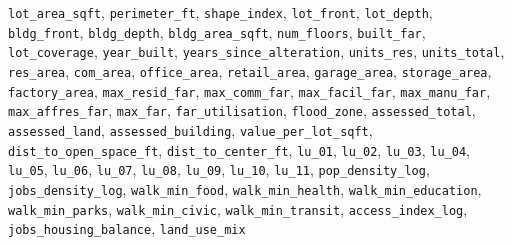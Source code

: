 \texttt{lot\_area\_sqft}, \allowbreak \texttt{perimeter\_ft}, \allowbreak \texttt{shape\_index}, \allowbreak \texttt{lot\_front}, \allowbreak \texttt{lot\_depth}, \allowbreak \texttt{bldg\_front}, \allowbreak \texttt{bldg\_depth}, \allowbreak \texttt{bldg\_area\_sqft}, \allowbreak \texttt{num\_floors}, \allowbreak \texttt{built\_far}, \allowbreak \texttt{lot\_coverage}, \allowbreak \texttt{year\_built}, \allowbreak \texttt{years\_since\_alteration}, \allowbreak \texttt{units\_res}, \allowbreak \texttt{units\_total}, \allowbreak \texttt{res\_area}, \allowbreak \texttt{com\_area}, \allowbreak \texttt{office\_area}, \allowbreak \texttt{retail\_area}, \allowbreak \texttt{garage\_area}, \allowbreak \texttt{storage\_area}, \allowbreak \texttt{factory\_area}, \allowbreak \texttt{max\_resid\_far}, \allowbreak \texttt{max\_comm\_far}, \allowbreak \texttt{max\_facil\_far}, \allowbreak \texttt{max\_manu\_far}, \allowbreak \texttt{max\_affres\_far}, \allowbreak \texttt{max\_far}, \allowbreak \texttt{far\_utilisation}, \allowbreak \texttt{flood\_zone}, \allowbreak \texttt{assessed\_total}, \allowbreak \texttt{assessed\_land}, \allowbreak \texttt{assessed\_building}, \allowbreak \texttt{value\_per\_lot\_sqft}, \allowbreak \texttt{dist\_to\_open\_space\_ft}, \allowbreak \texttt{dist\_to\_center\_ft}, \allowbreak \texttt{lu\_01}, \allowbreak \texttt{lu\_02}, \allowbreak \texttt{lu\_03}, \allowbreak \texttt{lu\_04}, \allowbreak \texttt{lu\_05}, \allowbreak \texttt{lu\_06}, \allowbreak \texttt{lu\_07}, \allowbreak \texttt{lu\_08}, \allowbreak \texttt{lu\_09}, \allowbreak \texttt{lu\_10}, \allowbreak \texttt{lu\_11}, \allowbreak \texttt{pop\_density\_log}, \allowbreak \texttt{jobs\_density\_log}, \allowbreak \texttt{walk\_min\_food}, \allowbreak \texttt{walk\_min\_health}, \allowbreak \texttt{walk\_min\_education}, \allowbreak \texttt{walk\_min\_parks}, \allowbreak \texttt{walk\_min\_civic}, \allowbreak \texttt{walk\_min\_transit}, \allowbreak \texttt{access\_index\_log}, \allowbreak \texttt{jobs\_housing\_balance}, \allowbreak \texttt{land\_use\_mix}
